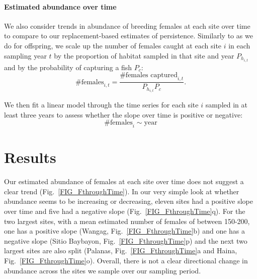 \documentclass[12pt, oneside]{article}   	%
\begin{document}
\paragraph*{Estimated abundance over time}

We also consider trends in abundance of breeding females at each site over time to compare to our replacement-based estimates of persistence. Similarly to as we do for offspring, we scale up the number of females caught at each site $i$ in each sampling year $t$ by the proportion of habitat sampled in that site and year $P_{h_{i,t}}$ and by the probability of capturing a fish $P_c$:
\begin{equation}
\text{\# females}_{i,t} = \frac{\text{\# females captured}_{i,t}}{P_{h_{i,t}}P_c}. \label{EQN_FemaleAbundance}
\end{equation}

We then fit a linear model through the time series for each site $i$ sampled in at least three years to assess whether the slope over time is positive or negative:  %
\begin{equation}
\text{\# females}_i \sim \text{year}
\end{equation}

\section*{Results}

Our estimated abundance of females at each site over time does not suggest a clear trend (Fig.\ \ref{FIG_FthroughTime}). In our very simple look at whether abundance seems to be increasing or decreasing, eleven sites had a positive slope over time and five had a negative slope (Fig.\ \ref{FIG_FthroughTime}q). For the two largest sites, with a mean estimated number of females of between 150-200, one has a positive slope (Wangag, Fig.\ \ref{FIG_FthroughTime}b) and one has a negative slope (Sitio Baybayon, Fig.\ \ref{FIG_FthroughTime}p) and the next two largest sites are also split (Palanas, Fig.\ \ref{FIG_FthroughTime}a and Haina, Fig.\ \ref{FIG_FthroughTime}o). Overall, there is not a clear directional change in abundance across the sites we sample over our sampling period.
\end{document}
